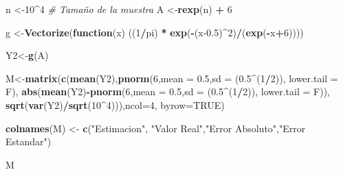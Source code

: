 \documentclass[
]{article}
\newenvironment{Shaded}{\begin{snugshade}}{\end{snugshade}}
\newcommand{\AttributeTok}[1]{\textcolor[rgb]{0.13,0.29,0.53}{#1}}
\newcommand{\CommentTok}[1]{\textcolor[rgb]{0.56,0.35,0.01}{\textit{#1}}}
\newcommand{\ConstantTok}[1]{\textcolor[rgb]{0.56,0.35,0.01}{#1}}
\newcommand{\ControlFlowTok}[1]{\textcolor[rgb]{0.13,0.29,0.53}{\textbf{#1}}}
\newcommand{\DecValTok}[1]{\textcolor[rgb]{0.00,0.00,0.81}{#1}}
\newcommand{\FloatTok}[1]{\textcolor[rgb]{0.00,0.00,0.81}{#1}}
\newcommand{\FunctionTok}[1]{\textcolor[rgb]{0.13,0.29,0.53}{\textbf{#1}}}
\newcommand{\NormalTok}[1]{#1}
\newcommand{\OtherTok}[1]{\textcolor[rgb]{0.56,0.35,0.01}{#1}}
\newcommand{\SpecialCharTok}[1]{\textcolor[rgb]{0.81,0.36,0.00}{\textbf{#1}}}
\newcommand{\StringTok}[1]{\textcolor[rgb]{0.31,0.60,0.02}{#1}}
\begin{document}
\begin{Shaded}
\begin{Highlighting}[]
\NormalTok{n }\OtherTok{\textless{}{-}}\DecValTok{10}\SpecialCharTok{\^{}}\DecValTok{4} \CommentTok{\# Tamaño de la muestra}
\NormalTok{A }\OtherTok{\textless{}{-}}\FunctionTok{rexp}\NormalTok{(n) }\SpecialCharTok{+} \DecValTok{6}

\NormalTok{g }\OtherTok{\textless{}{-}}\FunctionTok{Vectorize}\NormalTok{(}\ControlFlowTok{function}\NormalTok{(x) ((}\DecValTok{1}\SpecialCharTok{/}\NormalTok{pi) }\SpecialCharTok{*} \FunctionTok{exp}\NormalTok{(}\SpecialCharTok{{-}}\NormalTok{(x}\FloatTok{{-}0.5}\NormalTok{)}\SpecialCharTok{\^{}}\DecValTok{2}\NormalTok{)}\SpecialCharTok{/}\NormalTok{(}\FunctionTok{exp}\NormalTok{(}\SpecialCharTok{{-}}\NormalTok{x}\SpecialCharTok{+}\DecValTok{6}\NormalTok{))))}

\NormalTok{Y2}\OtherTok{\textless{}{-}}\FunctionTok{g}\NormalTok{(A)}

\NormalTok{M}\OtherTok{\textless{}{-}}\FunctionTok{matrix}\NormalTok{(}\FunctionTok{c}\NormalTok{(}\FunctionTok{mean}\NormalTok{(Y2),}\FunctionTok{pnorm}\NormalTok{(}\DecValTok{6}\NormalTok{,}\AttributeTok{mean =} \FloatTok{0.5}\NormalTok{,}\AttributeTok{sd =}\NormalTok{ (}\FloatTok{0.5}\SpecialCharTok{\^{}}\NormalTok{(}\DecValTok{1}\SpecialCharTok{/}\DecValTok{2}\NormalTok{)), }\AttributeTok{lower.tail =}\NormalTok{ F),}
            \FunctionTok{abs}\NormalTok{(}\FunctionTok{mean}\NormalTok{(Y2)}\SpecialCharTok{{-}}\FunctionTok{pnorm}\NormalTok{(}\DecValTok{6}\NormalTok{,}\AttributeTok{mean =} \FloatTok{0.5}\NormalTok{,}\AttributeTok{sd =}\NormalTok{ (}\FloatTok{0.5}\SpecialCharTok{\^{}}\NormalTok{(}\DecValTok{1}\SpecialCharTok{/}\DecValTok{2}\NormalTok{)), }\AttributeTok{lower.tail =}\NormalTok{ F)),}
            \FunctionTok{sqrt}\NormalTok{(}\FunctionTok{var}\NormalTok{(Y2)}\SpecialCharTok{/}\FunctionTok{sqrt}\NormalTok{(}\DecValTok{10}\SpecialCharTok{\^{}}\DecValTok{4}\NormalTok{))),}\AttributeTok{ncol=}\DecValTok{4}\NormalTok{, }\AttributeTok{byrow=}\ConstantTok{TRUE}\NormalTok{)}

\FunctionTok{colnames}\NormalTok{(M) }\OtherTok{\textless{}{-}} \FunctionTok{c}\NormalTok{(}\StringTok{"Estimacion"}\NormalTok{, }\StringTok{"Valor Real"}\NormalTok{,}\StringTok{"Error Absoluto"}\NormalTok{,}\StringTok{"Error Estandar"}\NormalTok{)}

\NormalTok{M}
\end{Highlighting}
\end{Shaded}
\end{document}
